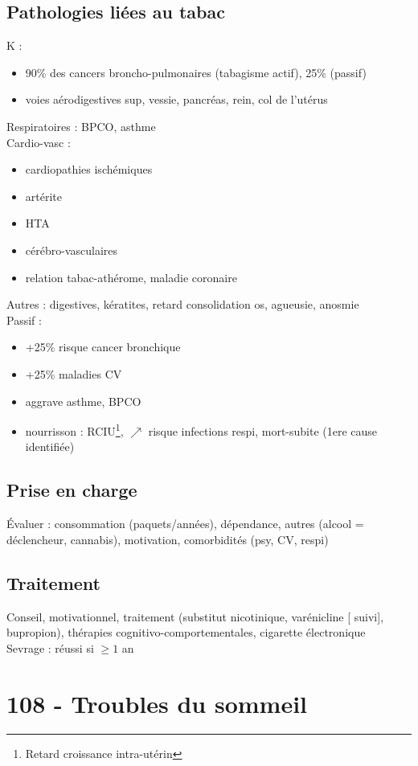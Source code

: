\subsection{Pathologies liées au tabac}
K :
\begin{itemize}
\item 90\% des cancers broncho-pulmonaires (tabagisme actif), 25\% (passif) 
\item voies aérodigestives sup, vessie, pancréas, rein, col de l'utérus
\end{itemize}
Respiratoires : BPCO, asthme\\
Cardio-vasc : 
\begin{itemize}
\item cardiopathies ischémiques
\item artérite
\item HTA
\item cérébro-vasculaires
\item relation tabac-athérome, maladie coronaire
\end{itemize}
Autres : digestives, kératites, retard consolidation os, agueusie, anosmie\\
Passif :
\begin{itemize}
\item +25\% risque cancer bronchique
\item +25\% maladies CV
\item aggrave asthme, BPCO
\item nourrisson : RCIU\footnote{Retard croissance intra-utérin}, \(\nearrow\) risque
  infections respi, mort-subite (1ere cause identifiée)
\end{itemize}
\subsection{Prise en charge}
Évaluer : consommation (paquets/années), dépendance, autres (alcool = déclencheur,
cannabis), motivation, comorbidités (psy, CV, respi)
\subsection{Traitement}
Conseil, motivationnel, traitement (substitut nicotinique, varénicline [\danger
suivi], bupropion), thérapies cognitivo-comportementales, cigarette
électronique\\
Sevrage : réussi si \(\ge 1\) an


\section{108 - Troubles du sommeil}
